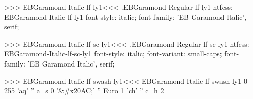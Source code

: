 >>>
\<EBGaramond-Italic-lf-ly1\><<<
.EBGaramond-Regular-lf-ly1
htfcss:  EBGaramond-Italic-lf-ly1  font-style: italic; font-family: 'EB Garamond Italic', serif;

>>>
\<EBGaramond-Italic-lf-sc-ly1\><<<
.EBGaramond-Regular-lf-sc-ly1
htfcss:  EBGaramond-Italic-lf-sc-ly1  font-style: italic; font-variant: small-caps; font-family: 'EB Garamond Italic', serif;

>>>
\<EBGaramond-Italic-lf-swash-ly1\><<<
EBGaramond-Italic-lf-swash-ly1 0 255
'aq' '' a_s 0
'&#x20AC;' '' Euro 1
'ch' '' c_h 2
